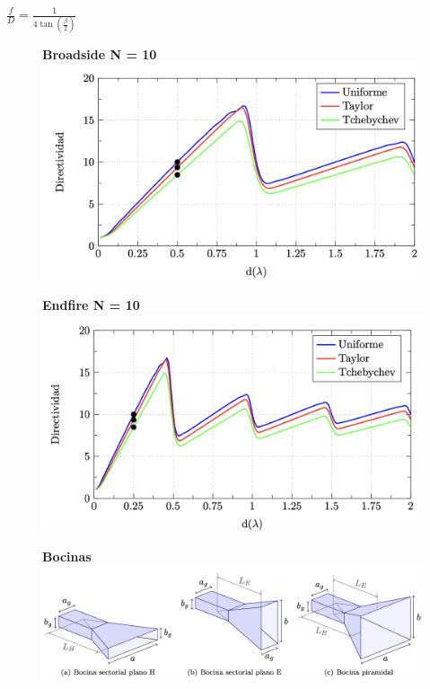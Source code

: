 \documentclass[twocolumn, 8pt]{extarticle}
\begin{document}
\vspace{0.5cm}
\( \frac{f}{D} = \frac{1}{4\tan\left(\frac{\beta}{2}\right)} \)

\newpage

\begin{multicols}{2}
    \begin{figure}[H]
        \centering
        \textbf{Broadside N = 10}
        \includegraphics[width=\columnwidth]{directividad_broadside.png}
    \end{figure}

    \begin{figure}[H]
        \centering
        \textbf{Endfire N = 10}
        \includegraphics[width=\columnwidth]{directividad_endfire.png}
    \end{figure}
\end{multicols}

\begin{figure}[H]
    \centering
    \textbf{Bocinas}
    \centering
    \includegraphics[width=\columnwidth]{bocinas.png}
\end{figure}
\end{document}
